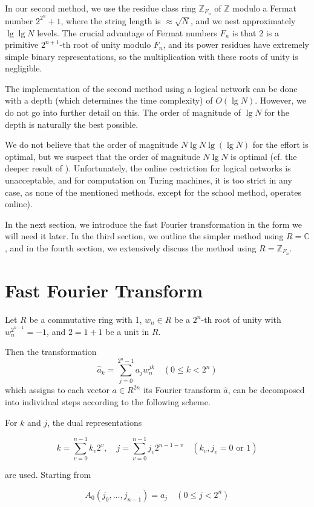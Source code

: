 \documentclass{article}
\begin{document}
In our second method, we use the residue class ring $\mathbb{Z}_{F_n}$ of $\mathbb{Z}$ modulo a Fermat number $2^{2^n} + 1$, where the string length is $\approx \sqrt{N}$, and we nest approximately $\lg \lg N$ levels. The crucial advantage of Fermat numbers $F_n$ is that 2 is a primitive $2^{n+1}$-th root of unity modulo $F_n$, and its power residues have extremely simple binary representations, so the multiplication with these roots of unity is negligible.

The implementation of the second method using a logical network can be done with a depth (which determines the time complexity) of $O(\lg N)$. However, we do not go into further detail on this. The order of magnitude of $\lg N$ for the depth is naturally the best possible.

We do not believe that the order of magnitude $N \lg N \lg(\lg N)$ for the effort is optimal, but we suspect that the order of magnitude $N \lg N$ is optimal (cf. the deeper result of \cite{cook2}). Unfortunately, the online restriction for logical networks is unacceptable, and for computation on Turing machines, it is too strict in any case, as none of the mentioned methods, except for the school method, operates online).

In the next section, we introduce the fast Fourier transformation in the form we will need it later. In the third section, we outline the simpler method using $R = \mathbb{C}$, and in the fourth section, we extensively discuss the method using $R = \mathbb{Z}_{F_n}$.

\section{Fast Fourier Transform}
Let $R$ be a commutative ring with 1, $w_n \in R$ be a $2^n$-th root of unity with $w_n^{2^{n - 1}} = -1$, and $2 = 1 + 1$ be a unit in $R$.

Then the transformation
\[
\tag{2.1}
\hat{a}_k = \sum_{j = 0}^{2^n - 1} a_j w_n^{jk} \quad (0 \le k < 2^n)
\]
which assigns to each vector $a \in R^{2n}$ its Fourier transform $\hat{a}$, can be decomposed into individual steps according to the following scheme.

For $k$ and $j$, the dual representations

\[
\tag{2.2}
k = \sum_{v = 0}^{n - 1} k_v 2^v, \quad j = \sum_{v = 0}^{n - 1} j_v 2^{n - 1 - v} \quad (k_v, j_v = 0\text{ or }1)
\]

are used. Starting from

\[
\tag{2.3}
A_0 (j_0, \ldots, j_{n - 1}) = a_j \quad (0 \le j < 2^n)
\]
\end{document}
